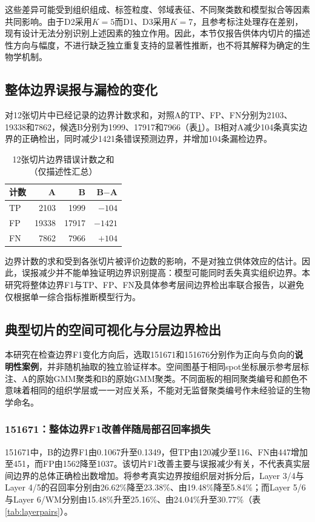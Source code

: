 \documentclass[UTF8,a4paper,12pt]{ctexart}
\begin{document}
这些差异可能受到组织组成、标签粒度、邻域表征、不同聚类数和模型拟合等因素共同影响。由于D2采用$K=5$而D1、D3采用$K=7$，且参考标注处理存在差别，现有设计无法分别识别上述因素的独立作用。因此，本节仅报告供体内切片的描述性方向与幅度，不进行缺乏独立重复支持的显著性推断，也不将其解释为确定的生物学机制。

\subsection{整体边界误报与漏检的变化}
\label{subsec:errors}
对12张切片中已经记录的边界计数求和，对照A的TP、FP、FN分别为2103、19338和7862，候选B分别为1999、17917和7966（表\ref{tab:errors}）。B相对A减少104条真实边界的正确检出，同时减少1421条错误预测边界，并增加104条漏检边界。

\begin{table}[htbp]
\centering
\caption{12张切片边界错误计数之和（仅描述性汇总）}
\label{tab:errors}
\begin{tabular}{lrrr}
\toprule
计数 & A & B & B$-$A \\
\midrule
TP & 2103 & 1999 & $-104$ \\
FP & 19338 & 17917 & $-1421$ \\
FN & 7862 & 7966 & $+104$ \\
\bottomrule
\end{tabular}
\end{table}

边界计数的求和受到各张切片被评价边数的影响，不是对独立供体效应的估计。因此，误报减少并不能单独证明边界识别提高：模型可能同时丢失真实组织边界。本研究将整体边界F1与TP、FP、FN及具体参考层间边界检出率联合报告，以避免仅根据单一综合指标推断模型行为。

\subsection{典型切片的空间可视化与分层边界检出}
\label{subsec:cases}
本研究在检查边界F1变化方向后，选取151671和151676分别作为正向与负向的\textbf{说明性案例}，并非随机抽取的独立验证样本。空间图基于相同spot坐标展示参考层标注、A的原始GMM聚类和B的原始GMM聚类。不同面板的相同聚类编号和颜色不意味着相同的组织学层或一一对应关系，不能对无监督聚类编号作未经验证的生物学命名。

\subsubsection{151671：整体边界F1改善伴随局部召回率损失}
151671中，B的边界F1由0.1067升至0.1349，但TP由120减少至116、FN由447增加至451，而FP由1562降至1037。该切片F1改善主要与误报减少有关，不代表真实层间边界的总体正确检出数增加。将参考真实边界按组织层对拆分后，Layer 3/4与Layer 4/5的召回率分别由26.62\%降至23.38\%、由19.48\%降至5.84\%；而Layer 5/6与Layer 6/WM分别由15.48\%升至25.16\%、由24.04\%升至30.77\%（表\ref{tab:layerpairs}）。
\end{document}
